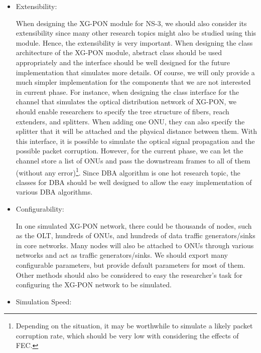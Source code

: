 \begin{itemize}
\item{Extensibility:}

When designing the XG-PON module for NS-3, we should also consider
its extensibility since many other research topics might also be
studied using this module. Hence, the extensibility is very
important. When designing the class architecture of the XG-PON
module, abstract class should be used appropriately and the
interface should be well designed for the future implementation
that simulates more details. Of course, we will only provide a
much simpler implementation for the components that we are not
interested in current phase. For instance, when designing the
class interface for the channel that simulates the optical
distribution network of XG-PON, we should enable researchers to
specify the tree structure of fibers, reach extenders, and
splitters. When adding one ONU, they can also specify the splitter
that it will be attached and the physical distance between them.
With this interface, it is possible to simulate the optical signal
propagation and the possible packet corruption. However, for the
current phase, we can let the channel store a list of ONUs and
pass the downstream frames to all of them (without any
error)\footnote{Depending on the situation, it may be worthwhile
to simulate a likely packet corruption rate, which should be very
low with considering the effects of FEC.}. Since DBA algorithm is
one hot research topic, the classes for DBA should be well
designed to allow the easy implementation of various DBA
algorithms.

\item{Configurability:}

In one simulated XG-PON network, there could be thousands of
nodes, such as the OLT, hundreds of ONUs, and hundreds of data
traffic generators/sinks in core networks. Many nodes will also be
attached to ONUs through various networks and act as traffic
generators/sinks. We should export many configurable parameters,
but provide default parameters for most of them. Other methods
should also be considered to easy the researcher's task for
configuring the XG-PON network to be simulated.


\item{Simulation Speed:}


\end{itemize}
